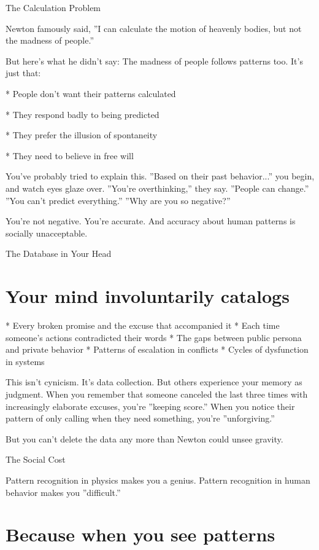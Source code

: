 \documentclass[12pt,oneside]{book}
\begin{document}
The Calculation Problem

Newton famously said, ''I can calculate the motion of heavenly bodies, but not the madness of people.''

But here's what he didn't say: The madness of people follows patterns too. It's just that:

                    * People don't want their patterns calculated

                    * They respond badly to being predicted

                    * They prefer the illusion of spontaneity

                    * They need to believe in free will

You've probably tried to explain this. ''Based on their past behavior...'' you begin, and watch eyes glaze over. ''You're overthinking,'' they say. ''People can change.'' ''You can't predict everything.'' ''Why are you so negative?''

You're not negative. You're accurate. And accuracy about human patterns is socially unacceptable.

The Database in Your Head

\section{Your mind involuntarily catalogs}

                    * Every broken promise and the excuse that accompanied it
                    * Each time someone's actions contradicted their words
                    * The gaps between public persona and private behavior
                    * Patterns of escalation in conflicts
                    * Cycles of dysfunction in systems

This isn't cynicism. It's data collection. But others experience your memory as judgment. When you remember that someone canceled the last three times with increasingly elaborate excuses, you're ''keeping score.'' When you notice their pattern of only calling when they need something, you're ''unforgiving.''

But you can't delete the data any more than Newton could unsee gravity.

The Social Cost

Pattern recognition in physics makes you a genius. Pattern recognition in human behavior makes you ''difficult.''

\section{Because when you see patterns}
\end{document}
